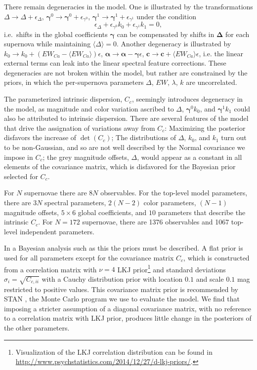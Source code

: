 \documentclass{aastex61}   	%
\begin{document}
There remain degeneracies in the model.  One is illustrated by the  transformations $\Delta \rightarrow \Delta  + \epsilon_\Delta$,
 $\pmb{\gamma}^0 \rightarrow \pmb{\gamma}^0  + \epsilon_{\gamma^0}$, $\pmb{\gamma}^1 \rightarrow \pmb{\gamma}^1 + \epsilon_{\gamma^1}$
 under the condition
$$
\epsilon_\Delta  +  \epsilon_{\gamma^0} k_0+  \epsilon_{\gamma^1} k_1=0,
$$
i.e.\ shifts in the global coefficients $\pmb{\gamma}$ can be compensated by shifts in $\pmb{\Delta}$ for each supernova while maintaining 
$\langle \Delta \rangle=0$.
Another degeneracy is illustrated by $k_0 \rightarrow k_0 + (EW_{Ca}-\langle EW_{Ca}\rangle)\epsilon$,
$\pmb{\alpha} \rightarrow \pmb{\alpha} - \pmb{\gamma} \epsilon$, $\mathbf{c} \rightarrow \mathbf{c} + \langle EW_{Ca}\rangle \epsilon$, i.e. the
linear external terms can leak into the linear spectral feature corrections.
These degeneracies are not broken within the model, but rather are constrained by the priors, in which the
per-supernova parameters
$\Delta$, $EW$, $\lambda$, $k$ are uncorrelated. 


The parameterized intrinsic dispersion, $C_c$, seemingly introduces degeneracy in the model, as magnitude and color variation
ascribed to $\Delta$, $\pmb{\gamma}^0 k_0$, and $\pmb{\gamma}^1 k_1$ could also be attributed to intrinsic dispersion.  There are several features of the model
that drive the assignation of variations away from $C_c$:  Maximizing the posterior disfavors the increase of $\det{(C_c)}$;
The distributions of $\Delta$, $k_0$, and $k_1$ turn out to
be non-Gaussian, and so are not well described by the Normal covariance we impose in $C_c$; the grey magnitude offsets, $\Delta$, would appear as a constant
in all elements of the covariance matrix, which is disfavored for the Bayesian prior selected for $C_c$.


For $N$ supernovae there are $8N$ observables.  For the top-level model parameters, there are $3N$ spectral parameters, $2(N-2)$
color parameters, $(N-1)$ magnitude offsets,  $5 \times 6$ global coefficients, and $10$ parameters that describe the intrinsic
$C_c$.  For $N=172$ supernovae, there are 1376 observables and 1067 top-level independent parameters.

In a Bayesian analysis such as this the priors must be described.  A flat prior is used for all parameters except
for the covariance matrix $C_c$, which is constructed from a correlation matrix with  $\nu=4$  LKJ prior\footnote{
Visualization of the LKJ correlation distribution can be found in \url{http://www.psychstatistics.com/2014/12/27/d-lkj-priors/}.}
\citep{Lewandowski20091989} and standard
deviations $\sigma_i = \sqrt{C_{c,ii}}$ with a  Cauchy distribution prior with location
 $0.1$ and scale $0.1$ mag restricted to positive values.
This covariance matrix prior is recommended by STAN \citep{stan}, the Monte Carlo program we use to evaluate the model.
 We find that imposing a stricter assumption of a
 diagonal covariance matrix, with no reference to a correlation matrix with LKJ prior, produces little change in the posteriors of
 the other parameters.
 
\end{document}
